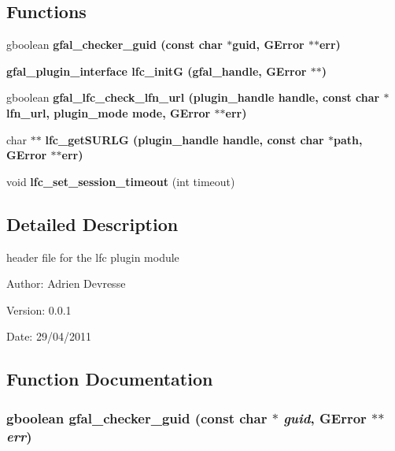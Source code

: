 \subsection*{Functions}
\begin{CompactItemize}
\item 
gboolean \bf{gfal\_\-checker\_\-guid} (const char $\ast$guid, GError $\ast$$\ast$err)
\item 
\bf{gfal\_\-plugin\_\-interface} \textbf{lfc\_\-init\-G} (gfal\_\-handle, GError $\ast$$\ast$)\label{gfal__common__lfc_8h_30773efdd2af3a2a53d6ffd3096049be}

\item 
gboolean \bf{gfal\_\-lfc\_\-check\_\-lfn\_\-url} (plugin\_\-handle handle, const char $\ast$lfn\_\-url, plugin\_\-mode mode, GError $\ast$$\ast$err)
\item 
char $\ast$$\ast$ \bf{lfc\_\-get\-SURLG} (plugin\_\-handle handle, const char $\ast$path, GError $\ast$$\ast$err)
\item 
void \textbf{lfc\_\-set\_\-session\_\-timeout} (int timeout)\label{gfal__common__lfc_8h_656ee4eb29a1bcf4e9e1d9a4aafd4c82}

\end{CompactItemize}


\subsection{Detailed Description}
header file for the lfc plugin module 

\begin{Desc}
\item[Author:]Adrien Devresse \end{Desc}
\begin{Desc}
\item[Version:]0.0.1 \end{Desc}
\begin{Desc}
\item[Date:]29/04/2011 \end{Desc}


\subsection{Function Documentation}
\subsubsection{\setlength{\rightskip}{0pt plus 5cm}gboolean gfal\_\-checker\_\-guid (const char $\ast$ {\em guid}, GError $\ast$$\ast$ {\em err})}\label{gfal__common__lfc_8h_c7f9448e809d5c82f58288d1491dc2d0}


